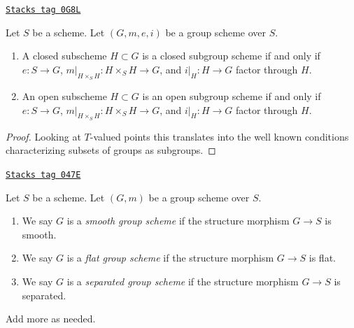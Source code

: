 \begin{lemma}
\label{groupoids-lemma-closed-subgroup-scheme}
\href{https://stacks.math.columbia.edu/tag/0G8L}{\texttt{Stacks tag 0G8L}}

Let $S$ be a scheme. Let $(G, m, e, i)$ be a group scheme over $S$.
\begin{enumerate}
\item A closed subscheme $H \subset G$ is a closed subgroup scheme
if and only if $e : S \to G$, $m|_{H \times_S H} : H \times_S H \to G$,
and $i|_H : H \to G$ factor through $H$.
\item An open subscheme $H \subset G$ is an open subgroup scheme
if and only if $e : S \to G$, $m|_{H \times_S H} : H \times_S H \to G$,
and $i|_H : H \to G$ factor through $H$.
\end{enumerate}
\end{lemma}

\begin{proof}
Looking at $T$-valued points this translates into the well known
conditions characterizing subsets of groups as subgroups.
\end{proof}

\begin{definition}
\label{groupoids-definition-smooth-group-scheme}
\href{https://stacks.math.columbia.edu/tag/047E}{\texttt{Stacks tag 047E}}

Let $S$ be a scheme. Let $(G, m)$ be a group scheme over $S$.
\begin{enumerate}
\item We say $G$ is a {\it smooth group scheme} if the structure
morphism $G \to S$ is smooth.
\item We say $G$ is a {\it flat group scheme} if the structure
morphism $G \to S$ is flat.
\item We say $G$ is a {\it separated group scheme} if the structure
morphism $G \to S$ is separated.
\end{enumerate}
Add more as needed.
\end{definition}

